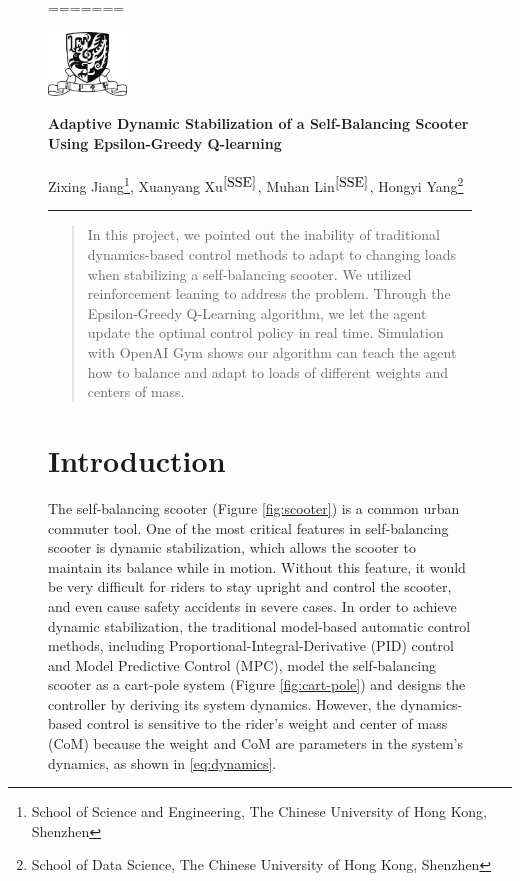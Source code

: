 \documentclass[10pt,a4paper]{article}
\begin{document}
	\begin{figure}[H]
=======
\begin{flushright}\vspace{-22mm}
	\includegraphics[height=1.7cm]{figure/logo.png}
\end{flushright}
	
\begin{center}\vspace{0.2cm}
	\textbf{\Large Adaptive Dynamic Stabilization of a Self-Balancing Scooter Using Epsilon-Greedy Q-learning}\\~\\
	\large Zixing Jiang\footnote{School of Science and Engineering, The Chinese University of Hong Kong, Shenzhen\label{SSE}}, Xuanyang Xu$^{\ref{SSE}}$, Muhan Lin$^{\ref{SSE}}$, Hongyi Yang\footnote{School of Data Science, The Chinese University of Hong Kong, Shenzhen}
\end{center}
{\noindent}\rule{\linewidth}{0.1mm}

\begin{abstract}
In this project, we pointed out the inability of traditional dynamics-based control methods to adapt to changing loads when stabilizing a self-balancing scooter. We utilized reinforcement leaning to address the problem. Through the Epsilon-Greedy Q-Learning algorithm, we let the agent update the optimal control policy in real time. Simulation with OpenAI Gym shows our algorithm can teach the agent how to balance and adapt to loads of different weights and centers of mass. 
\end{abstract} 

\section{Introduction}
The self-balancing scooter (Figure \ref{fig:scooter}) is a common urban commuter tool. One of the most critical features in self-balancing scooter is dynamic stabilization,  which allows the scooter to maintain its balance while in motion. Without this feature, it would be very difficult for riders to stay upright and control the scooter, and even cause safety accidents in severe cases. In order to achieve dynamic stabilization, the traditional model-based automatic control methods, including Proportional-Integral-Derivative (PID) control and Model Predictive Control (MPC), model the self-balancing scooter as a cart-pole system (Figure \ref{fig:cart-pole}) and designs the controller by deriving its system dynamics. However, the dynamics-based control is sensitive to the rider's weight and center of mass (CoM) because the weight and CoM are parameters in the system's dynamics, as shown in \eqref{eq:dynamics}.


\end{figure}
\end{document}

